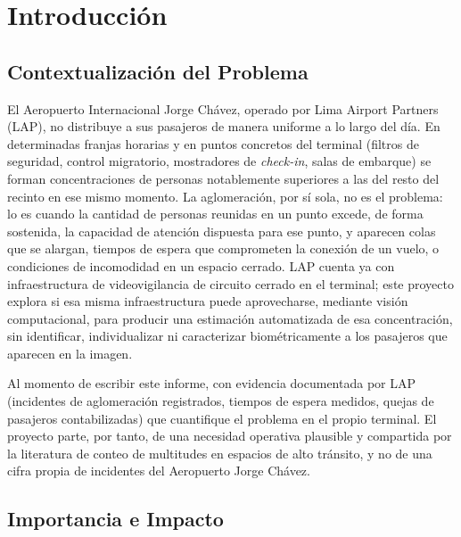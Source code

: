 \section{Introducción}
\label{sec:introduccion}

\subsection{Contextualización del Problema}
\label{subsec:contextualizacion}

El Aeropuerto Internacional Jorge Chávez, operado por Lima Airport Partners (LAP), no
distribuye a sus pasajeros de manera uniforme a lo largo del día. En determinadas franjas
horarias y en puntos concretos del terminal (filtros de seguridad, control migratorio,
mostradores de \emph{check-in}, salas de embarque) se forman concentraciones de personas
notablemente superiores a las del resto del recinto en ese mismo momento. La aglomeración,
por sí sola, no es el problema: lo es cuando la cantidad de personas reunidas en un punto
excede, de forma sostenida, la capacidad de atención dispuesta para ese punto, y aparecen
colas que se alargan, tiempos de espera que comprometen la conexión de un vuelo, o
condiciones de incomodidad en un espacio cerrado. LAP cuenta ya con infraestructura de
videovigilancia de circuito cerrado en el terminal; este proyecto explora si esa misma
infraestructura puede aprovecharse, mediante visión computacional, para producir una
estimación automatizada de esa concentración, sin identificar, individualizar ni caracterizar
biométricamente a los pasajeros que aparecen en la imagen.

Al momento de escribir este informe, con evidencia documentada por LAP (incidentes de
aglomeración registrados, tiempos de espera medidos, quejas de pasajeros contabilizadas) que
cuantifique el problema en el propio terminal. El proyecto parte, por tanto, de una necesidad
operativa plausible y compartida por la literatura de conteo de multitudes en espacios de alto
tránsito, y no de una cifra propia de incidentes del Aeropuerto Jorge Chávez.

\subsection{Importancia e Impacto}
\label{subsec:importancia-impacto}

